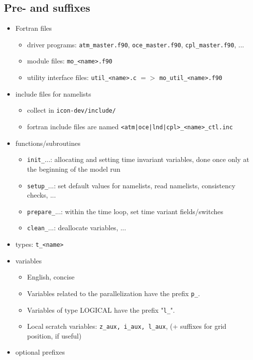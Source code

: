 \documentclass[a4paper,11pt,DIV16,BCOR1cm,titlepage]{scrartcl}
\begin{document}
\subsection{Pre- and suffixes}
%
\begin{itemize}
%
\item Fortran files
\begin{itemize}
\item driver programs: \texttt{atm\_master.f90}, \texttt{oce\_master.f90}, \texttt{cpl\_master.f90}, ...
\item module files: \texttt{mo\_<name>.f90}
\item utility interface files: \texttt{util\_<name>.c} $=>$ \texttt{mo\_util\_<name>.f90}
\end{itemize}
%
\item include files for namelists
\begin{itemize}
\item collect in \texttt{icon-dev/include/}
\item fortran include files are named \texttt{<atm|oce|lnd|cpl>\_<name>\_ctl.inc}
\end{itemize}
%
\item functions/subroutines
\begin{itemize}
\item \texttt{init\_}...: allocating and setting time invariant variables, done once only 
at the beginning of the model run
\item \texttt{setup\_}...: set default values for namelists, read namelists, consistency checks, ...
\item \texttt{prepare\_}...: within the time loop, set time variant fields/switches
\item \texttt{clean\_}...: deallocate variables, ...
\end{itemize}
%
\item types: \texttt{t\_<name>}
%
\item variables 
\begin{itemize}
\item English, concise
\item Variables related to the parallelization have the prefix \texttt{p\_}.
\item Variables of type LOGICAL have the prefix "\texttt{l\_}".
\item Local scratch variables: \texttt{z\_aux, i\_aux, l\_aux}, (+ suffixes for grid position, if useful)
\end{itemize}
%
\item optional prefixes

\end{itemize}
\end{document}
